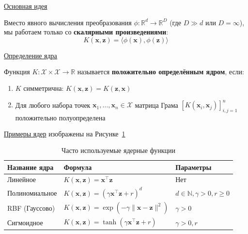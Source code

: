 \underline{Основная идея}

Вместо явного вычисления преобразования $\phi: \mathbb{R}^d \to \mathbb{R}^D$ (где $D \gg d$ или $D = \infty$),
мы работаем только со \textbf{скалярными произведениями}:
\[ K(\bm{x}, \bm{z}) = \langle \phi(\bm{x}), \phi(\bm{z}) \rangle \]

\underline{Определение ядра}

\begin{definition}
    Функция $K: \mathcal{X} \times \mathcal{X} \to \mathbb{R}$ называется \textbf{положительно определённым ядром},
    если:
    \begin{enumerate}
        \item $K$ симметрична: $K(\bm{x}, \bm{z}) = K(\bm{z}, \bm{x})$
        \item Для любого набора точек $\bm{x}_1, \dots, \bm{x}_n \in \mathcal{X}$ матрица Грама $[K(\bm{x}_i, \bm{x}_j)]_{i,j=1}^n$ положительно полуопределена
    \end{enumerate}
\end{definition}

\underline{Примеры ядер} изображены на Рисунке~\ref{tab:exmpls}

\begin{table}[h]
    \centering
    \begin{tabular}{|p{}|p{}|p{}|} \hline
        \textbf{Название ядра} & \textbf{Формула}                                           & \textbf{Параметры}                       \\ \hline
        Линейное               & $K(\bm{x}, \bm{z}) = \bm{x}^\top \bm{z}$                   & Нет                                      \\ \hline
        Полиномиальное         & $K(\bm{x}, \bm{z}) = (\gamma \bm{x}^\top \bm{z} + r)^d$    & $d \in \mathbb{N}, \gamma > 0, r \geq 0$ \\ \hline
        RBF (Гауссово)         & $K(\bm{x}, \bm{z}) = \exp(-\gamma \|\bm{x} - \bm{z}\|^2)$  & $\gamma > 0$                             \\ \hline
        Сигмоидное             & $K(\bm{x}, \bm{z}) = \tanh(\gamma \bm{x}^\top \bm{z} + r)$ & $\gamma > 0, r$                          \\ \hline
    \end{tabular}
    \caption{Часто используемые ядерные функции}
    \label{tab:exmpls}
\end{table}

